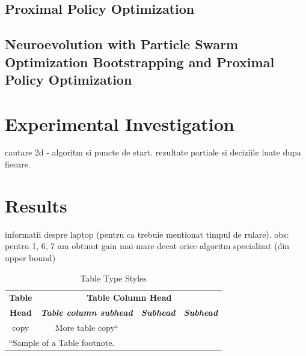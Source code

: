 \documentclass[conference]{IEEEtran}
\begin{document}
    \subsection{Proximal Policy Optimization}\label{subsec:proximal-policy-optimization}

    \subsection{Neuroevolution with Particle Swarm Optimization Bootstrapping and Proximal Policy Optimization}\label{subsec:neuroevolution-with-particle-swarm-optimization-bootstrapping-and-proximal-policy-optimization}


    \section{Experimental Investigation}\label{sec:experimental-investigation}
    cautare 2d - algoritm si puncte de start.
    rezultate partiale si deciziile luate dupa fiecare.


    \section{Results}\label{sec:results}
    informatii despre laptop (pentru ca trebuie mentionat timpul de rulare).
    obs: pentru 1, 6, 7 am obtinut gain mai mare decat orice algoritm specializat (din upper bound)

    \begin{table}[htbp]
        \caption{Table Type Styles}
        \begin{center}
            \begin{tabular}{|c|c|c|c|}
                \hline
                \textbf{Table}&\multicolumn{3}{|c|}{\textbf{Table Column Head}} \\
                \cline{2-4}
                \textbf{Head} & \textbf{\textit{Table column subhead}}& \textbf{\textit{Subhead}}& \textbf{\textit{Subhead}} \\
                \hline
                copy& More table copy$^{\mathrm{a}}$& &  \\
                \hline
                \multicolumn{4}{l}{$^{\mathrm{a}}$Sample of a Table footnote.}
            \end{tabular}
            \label{tab1}
        \end{center}
    \end{table}
\end{document}
